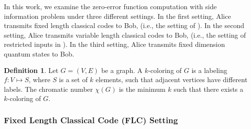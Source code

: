 \documentclass[journal, onecolumn, draftcls]{IEEEtran}
\theoremstyle{definition}
\newtheorem{definition}{Definition}
\newcommand{\meng}[1]{\marginpar{+}{\bf Ruoyu's remark}: {\em #1}}
\newcommand{\aditya}[1]{\marginpar{+}{\bf Aditya's remark}: {\em #1}}
\begin{document}

In this work, we examine the zero-error function computation with side information problem under three different settings. In the first setting, Alice transmits   fixed length classical codes to Bob,  (i.e., the setting of \cite{Witsenhausen_76}). In the second setting, Alice transmits   variable length classical codes to Bob,  (i.e., the setting of restricted inputs in  \cite{AlonO_96}). In the third setting, Alice transmits fixed dimension quantum states to Bob. %
\begin{definition}
    Let $G=(V,E)$ be a graph. A $k$-coloring of $G$ is a labeling $f:V\mapsto S$, where $S$ is a set of $k$ elements, such that adjacent vertices have different labels. The chromatic number $\chi(G)$ is the minimum $k$ such that there exists a $k$-coloring of $G$.
\end{definition}

\subsubsection{\bf Fixed Length Classical Code (FLC) Setting}



%
\end{document}
